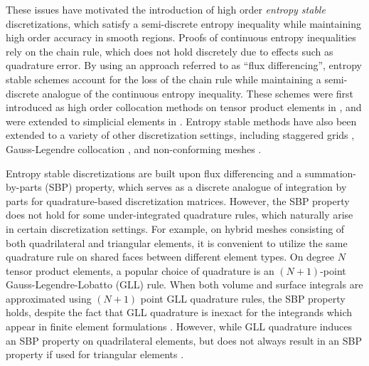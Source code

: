 \documentclass{svjour3}                     %
\begin{document}
These issues have motivated the introduction of high order \textit{entropy stable} discretizations, which satisfy a semi-discrete entropy inequality while maintaining high order accuracy in smooth regions.  Proofs of continuous entropy inequalities rely on the chain rule, which does not hold discretely due to effects such as quadrature error.   By using an approach referred to as ``flux differencing'', entropy stable schemes account for the loss of the chain rule while maintaining a semi-discrete analogue of the continuous entropy inequality.  These schemes were first introduced as high order collocation methods on tensor product elements in \cite{fisher2013high, carpenter2014entropy, gassner2016split, gassner2017br1}, and were extended to simplicial elements in \cite{crean2017high, chen2017entropy, crean2018entropy, chan2017discretely, chan2018discretely}.  Entropy stable methods have also been extended to a variety of other discretization settings, including staggered grids \cite{parsani2016entropy}, Gauss-Legendre collocation \cite{chan2018efficient}, and non-conforming meshes \cite{friedrich2017entropy}.  

Entropy stable discretizations are built upon flux differencing and a summation-by-parts (SBP) property, which serves as a discrete analogue of integration by parts for quadrature-based discretization matrices.  However, the SBP property does not hold for some under-integrated quadrature rules, which naturally arise in certain discretization settings.  For example, on hybrid meshes consisting of both quadrilateral and triangular elements, it is convenient to utilize the same quadrature rule on shared faces between different element types.  On degree $N$ tensor product elements, a popular choice of quadrature is an $(N+1)$-point Gauss-Legendre-Lobatto (GLL) rule.  When both volume and surface integrals are approximated using $(N+1)$ point GLL quadrature rules, the SBP property holds, despite the fact that GLL quadrature is inexact for the integrands which appear in finite element formulations \cite{fisher2013high}.  However, while GLL quadrature induces an SBP property on quadrilateral elements, but does not always result in an SBP property if used for triangular elements \cite{chan2017discretely}.  %
\end{document}
